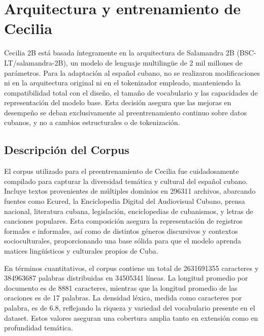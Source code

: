 \documentclass[10pt,twoside]{rcmart} %
\begin{document}
\section{Arquitectura y entrenamiento de Cecilia}

Cecilia 2B está basada íntegramente en la arquitectura de Salamandra 2B (BSC-LT/salamandra-2B), un modelo de lenguaje multilingüe de 2 mil millones de parámetros. Para la adaptación al español cubano, no se realizaron modificaciones ni en la arquitectura original ni en el tokenizador empleado, manteniendo la compatibilidad total con el diseño, el tamaño de vocabulario y las capacidades de representación del modelo base. Esta decisión asegura que las mejoras en desempeño se deban exclusivamente al preentrenamiento continuo sobre datos cubanos, y no a cambios estructurales o de tokenización.

\subsection{Descripción del Corpus}

El corpus utilizado para el preentrenamiento de Cecilia fue cuidadosamente compilado para capturar la diversidad temática y cultural del español cubano. Incluye textos provenientes de múltiples dominios en 296311 archivos, abarcando fuentes como Ecured, la Enciclopedia Digital del Audiovisual Cubano, prensa nacional, literatura cubana, legislación, enciclopedias de cubanismos, y letras de canciones populares. Esta composición asegura la representación de registros formales e informales, así como de distintos géneros discursivos y contextos socioculturales, proporcionando una base sólida para que el modelo aprenda matices lingüísticos y culturales propios de Cuba.

En términos cuantitativos, el corpus contiene un total de 2631691355 caracteres y 384963687 palabras distribuidas en 34505341 líneas. La longitud promedio por documento es de 8881 caracteres, mientras que la longitud promedio de las oraciones es de 17 palabras. La densidad léxica, medida como caracteres por palabra, es de 6.8, reflejando la riqueza y variedad del vocabulario presente en el dataset. Estos valores aseguran una cobertura amplia tanto en extensión como en profundidad temática.
\end{document}
